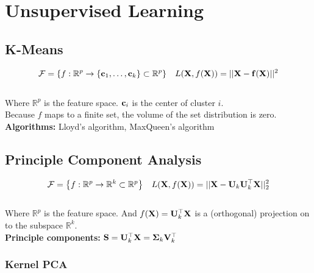 \section{Unsupervised Learning}
\begin{mdframed}[style=eqbox]
\subsection{K-Means}
\vspace*{-6pt}\begin{align*}
  \mathcal F = \left\{f: \mathbb R^p \to \{\mathbf{c}_1, \ldots, \mathbf{c}_k\} \subset \mathbb R^p \right\} && L(\mathbf{X}, f(\mathbf{X})) = \vert\vert \mathbf{X} - \mathbf{f}(\mathbf{X}) \vert\vert^2
\end{align*}\vspace*{-12pt}\\
\small{Where $\mathbb R^p$ is the feature space. $\mathbf{c}_i$ is the center of cluster $i$.}\\
Because $f$ maps to a finite set, the volume of the set distribution is zero.\\
\textbf{Algorithms:} Lloyd's algorithm, MaxQueen's algorithm
\end{mdframed}
%
\begin{mdframed}[style=eqbox]
\subsection{Principle Component Analysis}
\vspace*{-6pt}\begin{align*}
  \mathcal F = \left\{f: \mathbb R^p \to \mathbb R^k \subset \mathbb R^p \right\} && L(\mathbf{X}, f(\mathbf{X})) = \vert\vert \mathbf{X} - \mathbf{U}_k \mathbf{U}_k^\top\mathbf{X} \vert\vert_2^2
\end{align*}\vspace*{-12pt}\\
\small{Where $\mathbb R^p$ is the feature space. And $f(\mathbf{X}) =\mathbf{U}_k^\top \mathbf{X}$ is a (orthogonal) projection on to the subspace $\mathbb R^k$.}\\
\textbf{Principle components:} $\mathbf{S} = \mathbf{U}_k^\top \mathbf{X} = \mathbf{\Sigma}_k \mathbf{V}_k^\top$
\subsubsection{Kernel PCA}

\end{mdframed}